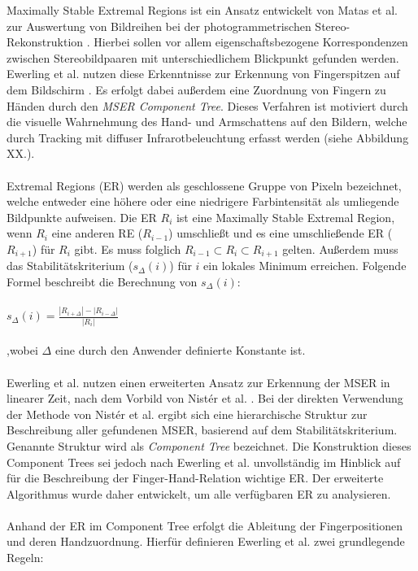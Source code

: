 Maximally Stable Extremal Regions ist ein Ansatz entwickelt von Matas et al. zur Auswertung von Bildreihen bei der photogrammetrischen Stereo-Rekonstruktion \cite{matas:2004}. Hierbei sollen vor allem eigenschaftsbezogene Korrespondenzen zwischen Stereobildpaaren mit unterschiedlichem Blickpunkt gefunden werden. Ewerling et al. nutzen diese Erkenntnisse zur Erkennung von Fingerspitzen auf dem Bildschirm \cite{ewerling:2012}. Es erfolgt dabei außerdem eine Zuordnung von Fingern zu Händen durch den \emph{MSER Component Tree}.  Dieses Verfahren ist motiviert durch die visuelle Wahrnehmung des Hand- und Armschattens auf den Bildern, welche durch Tracking mit diffuser Infrarotbeleuchtung erfasst werden (siehe Abbildung XX.).
\\\\
Extremal Regions (ER) werden als geschlossene Gruppe von Pixeln bezeichnet, welche entweder eine höhere oder eine niedrigere Farbintensität als umliegende Bildpunkte aufweisen. Die ER $R_i$ ist eine Maximally Stable Extremal Region, wenn $R_i$ eine anderen RE ($R_{i-1}$) umschließt und es eine umschließende ER ($R_{i+1}$) für $R_i$ gibt. Es muss folglich $R_{i-1} \subset R_i \subset R_{i+1}$ gelten. Außerdem muss das Stabilitätskriterium ($s_\Delta(i)$) für $i$ ein lokales Minimum erreichen. Folgende Formel beschreibt die Berechnung von $s_\Delta(i)$:
\\\\
$s_\Delta(i) = \frac{ |R_{i+\Delta}| - |R_{i-\Delta}| } { |R_i| }$
\\\\ 
,wobei $\Delta$ eine durch den Anwender definierte Konstante ist.
\\\\
Ewerling et al. nutzen einen erweiterten Ansatz zur Erkennung der MSER in linearer Zeit, nach dem Vorbild von Nistér et al. \cite{nister:2008}. Bei der direkten Verwendung der Methode von Nistér et al. ergibt sich eine hierarchische Struktur zur Beschreibung  aller gefundenen MSER, basierend auf dem Stabilitätskriterium. Genannte Struktur wird als \emph{Component Tree} bezeichnet. Die Konstruktion dieses Component Trees sei jedoch nach Ewerling et al. unvollständig im Hinblick auf für die Beschreibung der Finger-Hand-Relation wichtige ER. Der erweiterte Algorithmus wurde daher entwickelt, um alle verfügbaren ER zu analysieren.
\\\\
Anhand der ER im Component Tree erfolgt die Ableitung der Fingerpositionen und deren Handzuordnung. Hierfür definieren Ewerling et al. zwei grundlegende Regeln:

